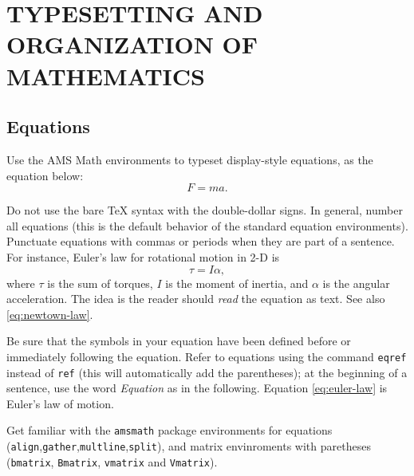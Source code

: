 \documentclass[letterpaper, 10 pt, conference]{ieeeconf}
\begin{document}
\section{TYPESETTING AND ORGANIZATION OF MATHEMATICS}
\subsection{Equations}

Use the AMS Math environments to typeset display-style equations, as the equation below:
\begin{equation}
  \label{eq:newtown-law}
  F=ma.
\end{equation}

Do not use the bare \TeX{} syntax with the double-dollar signs. In general, number all equations (this is the default behavior of the standard equation environments). Punctuate equations with commas or periods when they are part of a sentence. For instance, Euler's law for rotational motion in 2-D is
\begin{equation}
  \label{eq:euler-law}
  \tau=I\alpha,
\end{equation}
where $\tau$ is the sum of torques, $I$ is the moment of inertia, and $\alpha$ is the angular acceleration. The idea is the reader should \emph{read} the equation as text. See also \eqref{eq:newtown-law}.

Be sure that the symbols in your equation have been defined before or immediately following the equation. Refer to equations using the command \texttt{eqref} instead of \texttt{ref} (this will automatically add the parentheses); at the beginning of a sentence, use the word \emph{Equation} as in the following. Equation \eqref{eq:euler-law} is Euler's law of motion.

Get familiar with the \verb|amsmath| package environments for equations (\verb|align|,\verb|gather|,\verb|multline|,\verb|split|), and matrix envinroments with paretheses (\verb|bmatrix|, \verb|Bmatrix|, \verb|vmatrix| and \verb|Vmatrix|).
\end{document}
